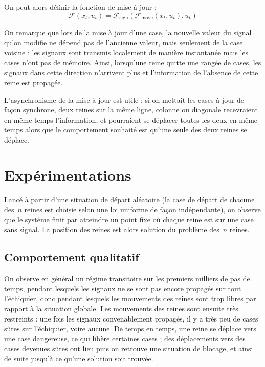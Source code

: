 \documentclass[11pt, openany, a4paper]{article}
\begin{document}
\bigskip

\noindent
On peut alors définir la fonction de mise à jour : $$\mathcal{F}(x_t, u_t) = \mathcal{F}_{\mathrm{sign}}(\mathcal{F}_{\mathrm{move}}(x_t, u_t), u_t)$$


On remarque que lors de la mise à jour d'une case, la nouvelle valeur du signal qu'on modifie ne dépend pas de l'ancienne valeur, mais seulement de la case voisine : les signaux sont transmis localement de manière instantanée mais les cases n'ont pas de mémoire. Ainsi, lorsqu'une reine quitte une rangée de cases, les signaux dans cette direction n'arrivent plus et l'information de l'absence de cette reine est propagée. 

L'asynchronisme de la mise à jour est utile : si on mettait les cases à jour de façon synchrone, deux reines sur la même ligne, colonne ou diagonale recevraient en même temps l'information, et pourraient se déplacer toutes les deux en même temps alors que le comportement souhaité est qu'une seule des deux reines se déplace. 










\section{Expérimentations}


Lancé à partir d'une situation de départ aléatoire (la case de départ de chacune des~$n$ reines est choisie selon une loi uniforme de façon indépendante), on observe que le système finit par atteindre un point fixe où chaque reine est sur une case sans signal. La position des reines est alors solution du problème des~$n$ reines.

\subsection{Comportement qualitatif}

On observe en général un régime transitoire sur les premiers milliers de pas de temps, pendant lesquels les signaux ne se sont pas encore propagés sur tout l'échiquier, donc pendant lesquels les mouvements des reines sont trop libres par rapport à la situation globale. Les mouvements des reines sont ensuite très restreints : une fois les signaux convenablement propagés, il y a très peu de cases sûres sur l'échiquier, voire aucune. De temps en temps, une reine se déplace vers une case dangereuse, ce qui libère certaines cases ; des déplacements vers des cases devenues sûres ont lieu puis on retrouve une situation de blocage, et ainsi de suite jusqu'à ce qu'une solution soit trouvée.
\end{document}
